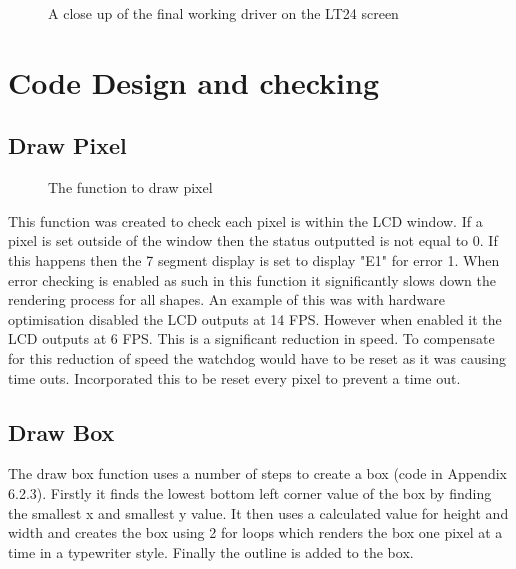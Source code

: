 \documentclass[a4paper,12pt]{article}
\newcommand{\GraphicsC}{../Graphics/Graphics.c}
\begin{document}
\begin{figure}[h]
	\centering
	\caption{A close up of the final working driver on the LT24 screen}
\end{figure}
\newpage
\section{Code Design and checking}
\subsection{Draw Pixel}
\begin{figure}[h]
	\centering
	\setlength{\belowcaptionskip}{-15pt}
	
	\caption{The function to draw pixel}
\end{figure}
\begin{flushleft}
This function was created to check each pixel is within the LCD window. If a pixel is set outside of the window then the status outputted is not equal to 0. If this happens then the 7 segment display is set to display "E1" for error 1. When error checking is enabled as such in this function it significantly slows down the rendering process for all shapes. An example of this was with hardware optimisation disabled the LCD outputs at 14 FPS. However when enabled it the LCD outputs at 6 FPS. This is a significant reduction in speed. To compensate for this reduction of speed the watchdog would have to be reset as it was causing time outs. Incorporated this to be reset every pixel to prevent a time out.
\end{flushleft}
\subsection{Draw Box}
\begin{flushleft}
The draw box function uses a number of steps to create a box (code in Appendix 6.2.3). Firstly it finds the lowest bottom left corner value of the box by finding the smallest x and smallest y value. It then uses a calculated value for height and width and creates the box using 2 for loops which renders the box one pixel at a time in a typewriter style. Finally the outline is added to the box.
\end{flushleft}
\end{document}
